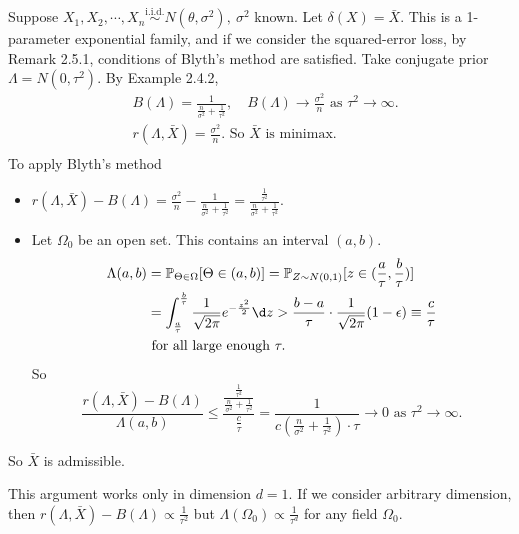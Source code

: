 \documentclass[a4paper]{article}
\begin{document}
\begin{eg}
	Suppose $X_1, X_2, \cdots, X_n \stackrel{\text{i.i.d.}}{\sim} N(\theta,\sigma^2), \ \sigma^2$ known. Let $\delta(X) = \bar{X}$. This is a 1-parameter exponential family, and if we consider the squared-error loss, by Remark 2.5.1, conditions of Blyth's method are satisfied. Take conjugate prior $\Lambda = N(0,\tau^2)$. By Example 2.4.2,
	\begin{equation*}
		\begin{aligned}
			& B(\Lambda) = \frac{1}{\frac{n}{\sigma^2} + \frac{1}{\tau^2}}, \quad B(\Lambda) \to \frac{\sigma^2}{n} \text{ as } \tau^2 \to \infty. \\
			& r(\Lambda,\bar{X}) = \frac{\sigma^2}{n}. \text{ So $\bar{X}$ is minimax.} \\
		\end{aligned}
	\end{equation*}
	To apply Blyth's method
	\begin{itemize}
		\item $r(\Lambda,\bar{X}) - B(\Lambda) = \frac{\sigma^2}{n} -\frac{1}{\frac{n}{\sigma^2} + \frac{1}{\tau^2}} = \frac{\frac{1}{\tau^2}}{\frac{n}{\sigma^2} + \frac{1}{\tau^2}}.$
		\item Let $\Omega_0$ be an open set. This contains an interval $(a,b)$.
		\begin{equation*}
			\begin{aligned}
				\Lambda(a,b) &= \mathbb{P}_{\Theta \in \Omega}[\Theta \in (a,b)] = \mathbb{P}_{Z \sim N(0,1)}[z \in (\frac{a}{\tau},\frac{b}{\tau})] \\
				&= \int_{\frac{a}{\tau}}^{\frac{b}{\tau}} \frac{1}{\sqrt{2\pi}} e^{-\frac{z^2}{2}} \d z > \frac{b-a}{\tau} \cdot \frac{1}{\sqrt{2\pi}} (1 - \epsilon) \equiv \frac{c}{\tau} \\
				& \text{ for all large enough } \tau.
			\end{aligned}
		\end{equation*}
		So
		\begin{equation}
			\frac{r(\Lambda,\bar{X}) - B(\Lambda)}{\Lambda(a,b)} \leq \frac{\frac{\frac{1}{\tau^2}}{\frac{n}{\sigma^2} + \frac{1}{\tau^2}}}{\frac{c}{\tau}} = \frac{1}{c(\frac{n}{\sigma^2} + \frac{1}{\tau^2}) \cdot {\tau}} \to 0 \text{ as } \tau^2 \to \infty.
		\end{equation}
	\end{itemize}
	So $\bar{X}$ is admissible.
\end{eg}

\begin{remark}
	This argument works only in dimension $d = 1$. If we consider arbitrary dimension, then $r(\Lambda,\bar{X}) - B(\Lambda) \propto \frac{1}{\tau^2}$ but $\Lambda(\Omega_0) \propto \frac{1}{\tau^d}$ for any field $\Omega_0$.
\end{remark}
\end{document}
